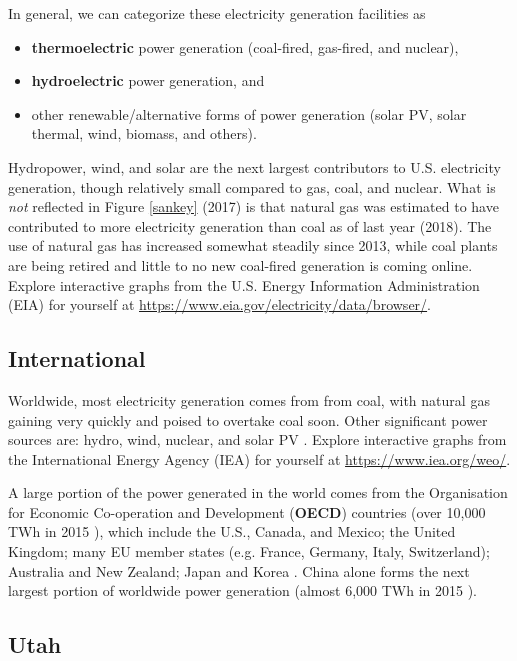 \documentclass[10pt]{article}
\begin{document}
In general, we can categorize these electricity generation facilities as

\begin{itemize}
    \item \textbf{thermoelectric} power generation (coal-fired, gas-fired, and nuclear),
    \item \textbf{hydroelectric} power generation, and
    \item other renewable/alternative forms of power generation (solar PV, solar thermal, wind, biomass, and others).
\end{itemize}

Hydropower, wind, and solar are the next largest contributors to U.S. electricity generation, though relatively small compared to gas, coal, and nuclear. What is \textit{not} reflected in Figure \ref{sankey} (2017) is that natural gas was estimated to have contributed to more electricity generation than coal as of last year (2018). The use of natural gas has increased somewhat steadily since 2013, while coal plants are being retired and little to no new coal-fired generation is coming online. Explore interactive graphs from the U.S. Energy Information Administration (EIA) for yourself at \url{https://www.eia.gov/electricity/data/browser/}.

\subsection{International}

Worldwide, most electricity generation comes from from coal, with natural gas gaining very quickly and poised to overtake coal soon. Other significant power sources are: hydro, wind, nuclear, and solar PV \cite{noauthor_undated-ge}. Explore interactive graphs from the International Energy Agency (IEA) for yourself at \url{https://www.iea.org/weo/}.

A large portion of the power generated in the world comes from the Organisation for Economic Co-operation and Development (\textbf{OECD}) countries (over 10,000 TWh in 2015 \cite{noauthor_undated-gz}), which include the U.S., Canada, and Mexico; the United Kingdom; many EU member states (e.g.  France, Germany, Italy, Switzerland); Australia and New Zealand; Japan and Korea \cite{noauthor_undated-yg}. China alone forms the next largest portion of worldwide power generation (almost 6,000 TWh in 2015 \cite{noauthor_undated-gz}).


\subsection{Utah}
\end{document}
